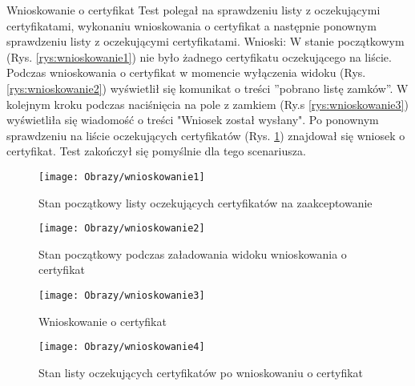 \begin{enumerate*}
	\newpage

	\item Wnioskowanie o certyfikat\newline
	Test polegał na sprawdzeniu listy z oczekującymi certyfikatami, wykonaniu wnioskowania o certyfikat a następnie ponownym sprawdzeniu listy z oczekującymi certyfikatami.
	Wnioski: W stanie początkowym (Rys. \ref{rys:wnioskowanie1}) nie było żadnego certyfikatu oczekującego na liście. Podczas wnioskowania o certyfikat w momencie wyłączenia widoku (Rys. \ref{rys:wnioskowanie2}) wyświetlił się  komunikat o treści ''pobrano listę zamków''. W kolejnym kroku podczas naciśnięcia na pole z zamkiem (Ry.s \ref{rys:wnioskowanie3}) wyświetliła się wiadomość o treści "Wniosek został wysłany". Po ponownym sprawdzeniu na liście oczekujących certyfikatów (Rys. \ref{rys:wnioskowanie4}) znajdował się wniosek o certyfikat. Test zakończył się pomyślnie dla tego scenariusza.
	\begin{figure}[ht!]
		\centering
		\begin{minipage}{0.3\textwidth}
			\texttt{[image: Obrazy/wnioskowanie1]}
			\caption{Stan początkowy listy oczekujących certyfikatów na zaakceptowanie }
			\label{rys:wnioskowanie1}
		\end{minipage}
		\begin{minipage}{0.3\textwidth}
			\texttt{[image: Obrazy/wnioskowanie2]}
			\caption{Stan początkowy podczas załadowania widoku wnioskowania o certyfikat}
			\label{rys:wnioskowanie2}
		\end{minipage}
	
		\begin{minipage}{0.3\textwidth}
		\texttt{[image: Obrazy/wnioskowanie3]}
		\caption{Wnioskowanie o certyfikat}
		\label{rys:wnioskowanie3}
	\end{minipage}
\hspace{0.2\textwidth}
	\begin{minipage}{0.3\textwidth}
		\texttt{[image: Obrazy/wnioskowanie4]}
		\caption{Stan listy oczekujących certyfikatów po wnioskowaniu o certyfikat}
		\label{rys:wnioskowanie4}
	\end{minipage}
	\end{figure}


\end{enumerate*}

